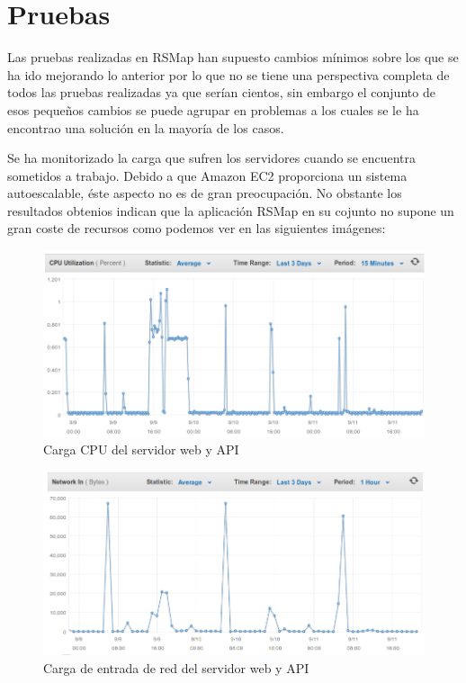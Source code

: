 \chapter{Pruebas}
\label{chap7}


Las pruebas realizadas en RSMap han supuesto cambios mínimos sobre los que se ha ido mejorando lo anterior por lo que no se tiene una perspectiva completa de todos las pruebas realizadas ya que serían cientos, sin embargo el conjunto de esos pequeños cambios se puede agrupar en problemas a los cuales se le ha encontrao una solución en la mayoría de los casos.
\bigskip

Se ha monitorizado la carga que sufren los servidores cuando se encuentra sometidos a trabajo. Debido a que Amazon EC2 proporciona un sistema autoescalable, éste aspecto no es de gran preocupación. No obstante los resultados obtenios indican que la aplicación RSMap en su cojunto no supone un gran coste de recursos como podemos ver en las siguientes imágenes:

\begin{figure}[ht]
  \begin{center}
    \includegraphics[scale=0.40]{../images/amazon/cpuweb.png}
    \caption{Carga CPU del servidor web y API}
    \label{fig:paquetes}
  \end{center}
\end{figure}

\newpage

\begin{figure}[ht]
  \begin{center}
    \includegraphics[scale=0.40]{../images/amazon/netweb.png}
    \caption{Carga de entrada de red del servidor web y API}
    \label{fig:paquetes}
  \end{center}
\end{figure}

